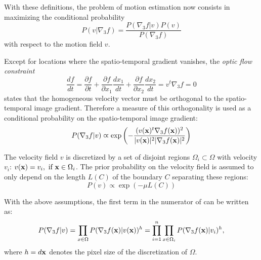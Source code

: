 With these definitions, the problem of motion estimation now consists in maximizing the conditional probability
\begin{equation}
  \label{eq:Proba_v-gradf_cremers2005}
  P(v | \nabla_3 f) = \frac{P(\nabla_3 f | v)P(v)}{P(\nabla_3 f)}
\end{equation}
with respect to the motion field $v$.

Except for locations where the spatio-temporal gradient vanishes, the \emph{optic flow constraint} 
\begin{equation}
  \label{eq:optic_flow}
  \frac{df}{dt} = \frac{\partial f}{\partial t} + \frac{\partial f}{\partial x_1} \frac{dx_1}{dt} + \frac{\partial f}{\partial x_2} \frac{dx_2}{dt} = v^t \nabla_3f = 0
\end{equation}
states that the homogeneous velocity vector must be orthogonal to the spatio-temporal image gradient. Therefore a measure of this orthogonality is used as a conditional probability on the spatio-temporal image gradient:
\begin{equation}
  \label{eq:Proba_gradf-v_cremers2005}
  P(\nabla_3 f | v) \varpropto \exp \left( - \frac{( v(\mathbf{x})^t \nabla_3 f(\mathbf{x}) )^2}{ |v(\mathbf{x})|^2 |\nabla_3 f(\mathbf{x})|^2} \right)
\end{equation}

The velocity field $v$ is discretized by a set of disjoint regions $\Omega_i \subset \Omega$ with velocity $v_i$: $v(\mathbf{x}) = {v_i,\text{ if }\mathbf{x} \in \Omega_i}$. The prior probability on the velocity field is assumed to only depend on the length $L(C)$ of the boundary $C$ separating these regions:
\begin{equation}
  \label{eq:Proba_v_cremers2005}
  P(v) \varpropto \exp \left( - \mu L(C) \right)
\end{equation}

With the above assumptions, the first term in the numerator of  can be written as:
\begin{equation}
  \label{eq:Proba_gradf-v2_cremers2005}
  P(\nabla_3 f | v) = \prod_{x \in \Omega} P(\nabla_3 f(\mathbf{x}) | v(\mathbf{x}))^h = \prod_{i=1}^n { \prod_{x \in \Omega_i} { P(\nabla_3 f(\mathbf{x}) | v_i)^h } },
\end{equation}
where $h = d\mathbf{x}$ denotes the pixel size of the discretization of $\Omega$.

